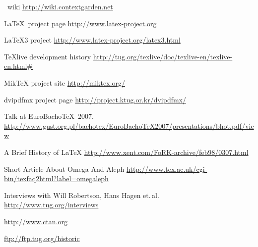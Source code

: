 \documentclass{scrartcl}
\begin{document}
\begin{thebibliography}{10}
	\vspace{2ex}
	\vspace{1ex}
	\ConTeXt\ wiki
	\newblock \url{http://wiki.contextgarden.net}
	
	{\LaTeX\ project page}
	\newblock \url{http://www.latex-project.org}
	
	{\LaTeX3 project}
	\newblock \url{http://www.latex-project.org/latex3.html}
	
	\vspace{2ex}
	\vspace{1ex}
	{TeXlive development history}
	\newblock \url{http://tug.org/texlive/doc/texlive-en/texlive-en.html#}

	{MikTeX project site}
	\newblock \url{http://miktex.org/}

	\vspace{2ex}
	\vspace{1ex}
	{dvipdfmx project page}
	\newblock \url{http://project.ktug.or.kr/dvipdfmx/}
	
	\vspace{2ex}
	\vspace{1ex}
	\newblock Talk at EuroBacho\TeX\ 2007.\\
	\newblock \url{http://www.gust.org.pl/bachotex/EuroBachoTeX2007/presentations/bhot.pdf/view}
	
	{A Brief History of \LaTeX}
	\newblock \url{http://www.xent.com/FoRK-archive/feb98/0307.html}
	
	{Short Article About Omega And Aleph}
	\newblock \url{http://www.tex.ac.uk/cgi-bin/texfaq2html?label=omegaleph}
	
	{Interviews with Will Robertson, Hans Hagen et.\,al.}
	\newblock \url{http://www.tug.org/interviews}
	
	\vspace{2ex}
	\vspace{1ex}
	
	\newblock \url{http://www.ctan.org}
	
	\newblock \url{ftp://ftp.tug.org/historic}
\end{thebibliography}

\label{sec:text}
\end{document}
